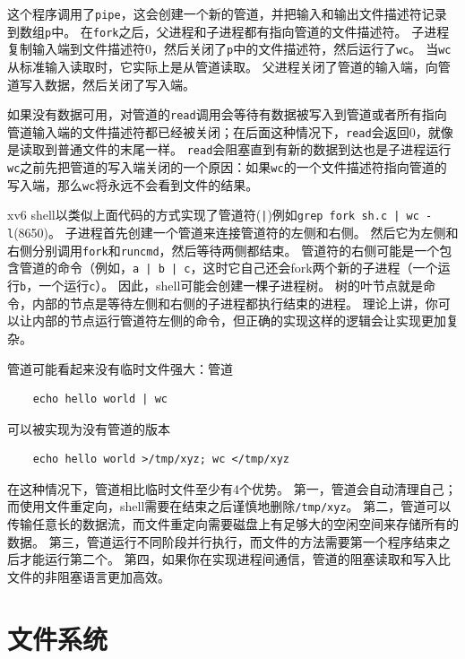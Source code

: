 这个程序调用了\texttt{pipe}，这会创建一个新的管道，并把输入和输出文件描述符记录到数组\texttt{p}中。
在\texttt{fork}之后，父进程和子进程都有指向管道的文件描述符。
子进程复制输入端到文件描述符0，然后关闭了\texttt{p}中的文件描述符，然后运行了\texttt{wc}。
当\texttt{wc}从标准输入读取时，它实际上是从管道读取。
父进程关闭了管道的输入端，向管道写入数据，然后关闭了写入端。

如果没有数据可用，对管道的\texttt{read}调用会等待有数据被写入到管道或者所有指向管道输入端的文件描述符都已经被关闭；在后面这种情况下，\texttt{read}会返回0，就像是读取到普通文件的末尾一样。
\texttt{read}会阻塞直到有新的数据到达也是子进程运行\texttt{wc}之前先把管道的写入端关闭的一个原因：如果\texttt{wc}的一个文件描述符指向管道的写入端，那么\texttt{wc}将永远不会看到文件的结果。

xv6 shell以类似上面代码的方式实现了管道符(\texttt{|})例如\texttt{grep fork sh.c | wc -l}(8650)。
子进程首先创建一个管道来连接管道符的左侧和右侧。
然后它为左侧和右侧分别调用\texttt{fork}和\texttt{runcmd}，然后等待两侧都结束。
管道符的右侧可能是一个包含管道的命令（例如，\texttt{a | b | c}，这时它自己还会fork两个新的子进程（一个运行\texttt{b}，一个运行\texttt{c}）。
因此，shell可能会创建一棵子进程树。
树的叶节点就是命令，内部的节点是等待左侧和右侧的子进程都执行结束的进程。
理论上讲，你可以让内部的节点运行管道符左侧的命令，但正确的实现这样的逻辑会让实现更加复杂。

管道可能看起来没有临时文件强大：管道
\begin{lstlisting}
    echo hello world | wc    
\end{lstlisting}
可以被实现为没有管道的版本
\begin{lstlisting}
    echo hello world >/tmp/xyz; wc </tmp/xyz
\end{lstlisting}

在这种情况下，管道相比临时文件至少有4个优势。
第一，管道会自动清理自己；而使用文件重定向，shell需要在结束之后谨慎地删除\texttt{/tmp/xyz}。
第二，管道可以传输任意长的数据流，而文件重定向需要磁盘上有足够大的空闲空间来存储所有的数据。
第三，管道运行不同阶段并行执行，而文件的方法需要第一个程序结束之后才能运行第二个。
第四，如果你在实现进程间通信，管道的阻塞读取和写入比文件的非阻塞语言更加高效。

\section*{文件系统}
